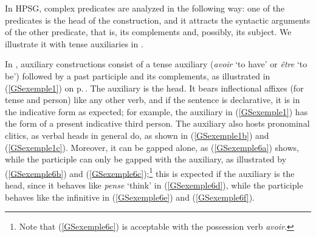 \largerpage
In HPSG, complex predicates are analyzed in the following way: one of the predicates is the head of
the construction, and it attracts the syntactic arguments of the other predicate, that is, its
complements and, possibly, its subject. We illustrate it with tense auxiliaries in 
\citep{abeille1994complementation, AG2002b-u}.

In , auxiliary constructions consist of a tense auxiliary (\emph{avoir} `to have' or \emph{\^etre} `to be') followed by a past participle and its complements, as illustrated in (\ref{GSexemple1}) on p.\,\pageref{GSexemple1}. The auxiliary is the head.
It bears inflectional affixes (for tense and person) like any other verb, and if the sentence is declarative, it is in the indicative form as expected; for example, the auxiliary in (\ref{GSexemple1}) has the form of a present indicative third person. 
The auxiliary also hosts pronominal clitics, as verbal heads in general do, as shown in (\ref{GSexemple1b}) and (\ref{GSexemple1c}). Moreover, it can be gapped alone, as (\ref{GSexemple6a}) shows, while the participle can only be gapped with the auxiliary, as illustrated by (\ref{GSexemple6b}) and (\ref{GSexemple6c});\footnote{Note that (\ref{GSexemple6c}) is acceptable with the possession verb \emph{avoir}.} this is expected if the auxiliary is the head, since it behaves like \emph{pense} `think' in (\ref{GSexemple6d}), while the participle behaves like the infinitive in (\ref{GSexemple6e}) and (\ref{GSexemple6f}). 

\largerpage
\eal
	\label{GSexemple6}
	\label{GSexemple6a}
		
	\label{GSexemple6b}
		
	\label{GSexemple6c}
				
